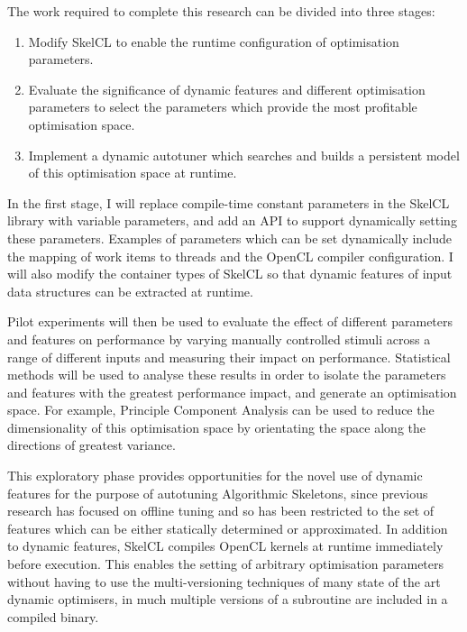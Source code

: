 The work required to complete this research can be divided into three
stages:

\begin{enumerate}
\item Modify SkelCL to enable the runtime configuration of
  optimisation parameters.
\item Evaluate the significance of dynamic features and different
  optimisation parameters to select the parameters which provide the
  most profitable optimisation space.
\item Implement a dynamic autotuner which searches and builds a
  persistent model of this optimisation space at runtime.
\end{enumerate}

In the first stage, I will replace compile-time constant parameters in
the SkelCL library with variable parameters, and add an API to support
dynamically setting these parameters. Examples of parameters which can
be set dynamically include the mapping of work items to threads and
the OpenCL compiler configuration. I will also modify the container
types of SkelCL so that dynamic features of input data structures can
be extracted at runtime.

Pilot experiments will then be used to evaluate the effect of
different parameters and features on performance by varying manually
controlled stimuli across a range of different inputs and measuring
their impact on performance. Statistical methods will be used to
analyse these results in order to isolate the parameters and features
with the greatest performance impact, and generate an optimisation
space. For example, Principle Component Analysis can be used to reduce
the dimensionality of this optimisation space by orientating the space
along the directions of greatest variance.

This exploratory phase provides opportunities for the novel use of
dynamic features for the purpose of autotuning Algorithmic Skeletons,
since previous research has focused on offline tuning and so has been
restricted to the set of features which can be either statically
determined or approximated. In addition to dynamic features, SkelCL
compiles OpenCL kernels at runtime immediately before execution. This
enables the setting of arbitrary optimisation parameters without
having to use the multi-versioning techniques of many state of the art
dynamic optimisers, in much multiple versions of a subroutine are
included in a compiled binary.

